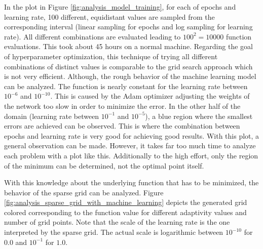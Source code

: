 In the plot in Figure \ref{fig:analysis_model_training}, for each of epochs and learning rate, 100 different, equidistant values are sampled from the corresponding interval (linear sampling for epochs and log sampling for learning rate). All different combinations are evaluated leading to $ 100^2 = 10000 $ function evaluations. This took about 45 hours on a normal machine. Regarding the goal of hyperparameter optimization, this technique of trying all different combinations of distinct values is comparable to the grid search approach which is not very efficient. Although, the rough behavior of the machine learning model can be analyzed. The function is nearly constant for the learning rate between $ 10^{-6} $ and $ 10^{-10} $. This is caused by the Adam optimizer adjusting the weights of the network too slow in order to minimize the error. In the other half of the domain (learning rate between $ 10^{-1} $ and $ 10^{-5} $), a blue region where the smallest errors are achieved can be observed. This is where the combination between epochs and learning rate is very good for achieving good results. With this plot, a general observation can be made. However, it takes far too much time to analyze each problem with a plot like this. Additionally to the high effort, only the region of the minimum can be determined, not the optimal point itself. \newline

With this knowledge about the underlying function that has to be minimized, the behavior of the sparse grid can be analyzed. Figure \ref{fig:analysis_sparse_grid_with_machine_learning} depicts the generated grid colored corresponding to the function value for different adaptivity values and number of grid points. Note that the scale of the learning rate is the one interpreted by the sparse grid. The actual scale is logarithmic between $ 10^{-10} $ for $ 0.0 $ and $ 10 ^{-1} $ for $ 1.0 $. 

